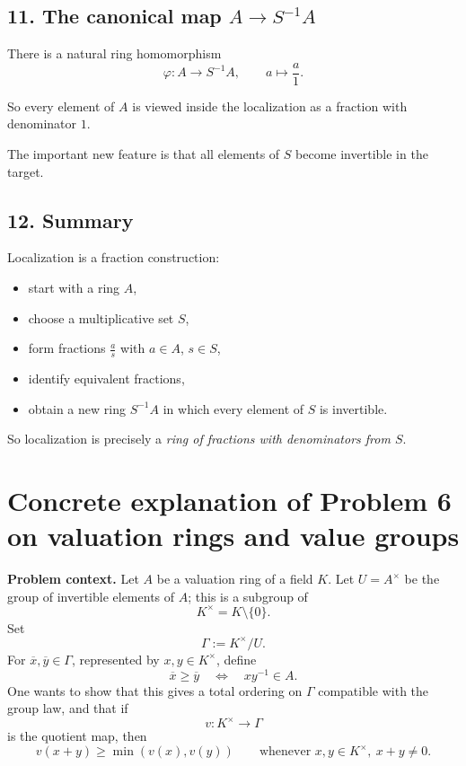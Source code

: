 \documentclass[12pt,a4paper]{article}
\theoremstyle{notespace}
\begin{document}
\subsection{11. The canonical map \(A\to S^{-1}A\)}

There is a natural ring homomorphism
\[
\varphi:A\to S^{-1}A,
\qquad
a\mapsto \frac{a}{1}.
\]

So every element of \(A\) is viewed inside the localization as a fraction with denominator \(1\).

The important new feature is that all elements of \(S\) become invertible in the target.

\subsection{12. Summary}

Localization is a fraction construction:

\begin{itemize}
	\item start with a ring \(A\),
	\item choose a multiplicative set \(S\),
	\item form fractions \(\frac{a}{s}\) with \(a\in A\), \(s\in S\),
	\item identify equivalent fractions,
	\item obtain a new ring \(S^{-1}A\) in which every element of \(S\) is invertible.
\end{itemize}

So localization is precisely a \emph{ring of fractions with denominators from \(S\)}.

\section{Concrete explanation of Problem 6 on valuation rings and value groups}

\textbf{Problem context.}
Let \(A\) be a valuation ring of a field \(K\). Let \(U=A^\times\) be the group of invertible elements of \(A\); this is a subgroup of
\[
K^\times=K\setminus\{0\}.
\]
Set
\[
\Gamma:=K^\times/U.
\]
For \(\overline x,\overline y\in \Gamma\), represented by \(x,y\in K^\times\), define
\[
\overline x \ge \overline y
\quad \Longleftrightarrow \quad
xy^{-1}\in A.
\]
One wants to show that this gives a total ordering on \(\Gamma\) compatible with the group law, and that if
\[
v:K^\times\to \Gamma
\]
is the quotient map, then
\[
v(x+y)\ge \min(v(x),v(y))
\qquad
\text{whenever } x,y\in K^\times,\ x+y\neq 0.
\]
\end{document}
